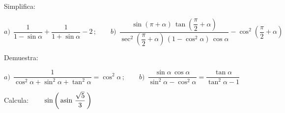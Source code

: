 \begin{mipropuesto}

Simplifica:

\vspace{1mm} $a)\ \ \dfrac{1}{1-\sin \alpha}+\dfrac{1}{1+\sin \alpha}-2\, ;\qquad b)\ \ \dfrac{\sin(\pi+ \alpha)\, \tan \left( \dfrac \pi 2 + \alpha \right) }{ \sec^2 \left( \dfrac \pi 2 + \alpha \right)\, (1-\cos^2 \alpha )\, \cos \alpha }-\cos^2 \left( \dfrac \pi 2 + \alpha \right)$	
\end{mipropuesto}

\vspace{-8mm}
\begin{flushright}
\begin{footnotesize} \textcolor{gris}{}	\end{footnotesize}
\end{flushright}


\begin{mipropuesto}

Demuestra:

\vspace{1mm} $a)\ \ \dfrac1{\cos^2 \alpha+\sin^2 \alpha + \tan^2 \alpha}=\cos^2 \alpha\, ; \qquad b)\ \ \dfrac{\sin \alpha \, \cos \alpha}{\sin^2 \alpha - \cos^2 \alpha}=\dfrac{\tan \alpha}{\tan^2 \alpha - 1}$	
\end{mipropuesto}

\vspace{-8mm}
\begin{flushright}
\begin{footnotesize} \textcolor{gris}{}	\end{footnotesize}
\end{flushright}



\begin{mipropuesto}

 Calcula: $\qquad \sin \left( \, \asin  \, \dfrac{\sqrt{5}}{3} \, \right) $

\end{mipropuesto}

\vspace{-8mm}
\begin{flushright}
\begin{footnotesize} \textcolor{gris}{}	\end{footnotesize}
\end{flushright}


